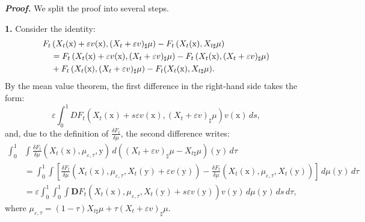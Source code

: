 \documentclass[sn-mathphys-num]{sn-jnl}
\numberwithin{equation}{section}
\theoremstyle{mythm}
\theoremstyle{mydef}
\renewenvironment{proof}{\smallskip\noindent\emph{\textbf{Proof.}}%
  \hspace{1pt}}{\hspace{-5pt}{\nobreak\quad\nobreak\hfill\nobreak%
    $\square$\vspace{2pt}\par}\smallskip\goodbreak}
\renewcommand{\d}{\,d}
\renewcommand{\mathbf}[1]{\bm{#1}}
\begin{document}
\begin{proof}
  We split the proof into several steps.

  \textbf{1.} Consider the identity:
  \begin{align}
    F_{t} &\left(X_t(\mathrm{x}) + \varepsilon v(\mathrm{x}), (X_t + \varepsilon v)_{\sharp}\mu  \right) - F_{t}\left(X_t(\mathrm{x}),X_{t\sharp}\mu\right)\notag\\
    &= F_{t} \left( X_t(\mathrm{x}) + \varepsilon v(\mathrm{x}), (X_t + \varepsilon v)_{\sharp}\mu  \right) - F_{t} \left( X_t(\mathrm{x}), (X_t + \varepsilon v)_{\sharp}\mu  \right)\notag\\
    &+ F_{t} \left( X_t(\mathrm{x}), (X_t + \varepsilon v)_{\sharp}\mu  \right) - F_{t}(X_t(\mathrm{x}),X_{t\sharp}\mu).
    \label{eq:aux0}
  \end{align}
  By the mean value theorem, the first difference in the right-hand side takes the form:
  \begin{displaymath}
    \varepsilon\int_{0}^{1} DF_{t} \left( X_t(\mathrm{x}) + s\varepsilon v(\mathrm{x}), (X_t + \varepsilon v)_{\sharp}\mu \right)v(\mathrm{x}) \d s,
  \end{displaymath}
 and, due to the definition of \( \frac{\delta F_t}{\delta \mu} \), the second difference writes:
  \begin{align*}
    \int_{0}^{1}
    &\int \frac{\delta F_{t}}{\delta \mu} \left(X_t(\mathrm{x}), \mu_{\varepsilon,\tau}, \mathrm{y} \right) \d \left( (X_t + \varepsilon v)_{\sharp}\mu - X_{t\sharp}\mu \right)(\mathrm{y}) \d \tau\\
    &= \int_{0}^{1}\int \left[\frac{\delta F_{t}}{\delta \mu} \left(X_t(\mathrm{x}), \mu_{\varepsilon,\tau}, X_t(\mathrm{y}) + \varepsilon v(\mathrm{y}) \right) - \frac{\delta F_{t}}{\delta \mu} \left(X_t(\mathrm{x}), \mu_{\varepsilon,\tau}, X_t(\mathrm{y}) \right)\right] \d \mu(\mathrm{y}) \d \tau\\
    &= \varepsilon\int_{0}^{1}\int_{0}^{1}\int \mathbf{D}F_{t} \left(X_t(\mathrm{x}), \mu_{\varepsilon,\tau}, X_t(\mathrm{y}) + s\varepsilon v(\mathrm{y})\right)v(\mathrm{y}) \d \mu(\mathrm{y}) \d s \d \tau,
  \end{align*}
  where \( \mu_{\varepsilon,\tau} = (1-\tau) X_{t\sharp} \mu + \tau (X_t + \varepsilon v)_{\sharp}\mu \).


\end{proof}
\end{document}
